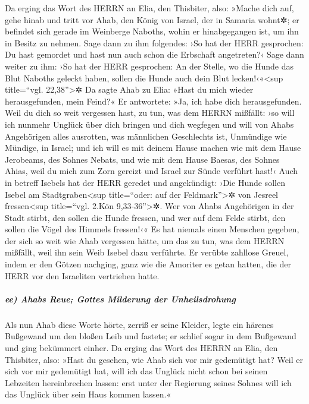 Da erging das Wort des HERRN an Elia, den Thisbiter,
also: »Mache dich auf, gehe hinab und tritt vor Ahab, den
König von Israel, der in Samaria wohnt✲; er befindet sich gerade im
Weinberge Naboths, wohin er hinabgegangen ist, um ihn in Besitz zu
nehmen. Sage dann zu ihm folgendes: ›So hat der HERR
gesprochen: Du hast gemordet und hast nun auch schon die Erbschaft
angetreten?‹ Sage dann weiter zu ihm: ›So hat der HERR gesprochen: An
der Stelle, wo die Hunde das Blut Naboths geleckt haben, sollen die
Hunde auch dein Blut lecken!‹«\textless sup title=``vgl.
22,38''\textgreater✲ Da sagte Ahab zu Elia: »Hast du mich
wieder herausgefunden, mein Feind?« Er antwortete: »Ja, ich habe dich
herausgefunden. Weil du dich so weit vergessen hast, zu tun, was dem
HERRN mißfällt: ›so will ich nunmehr Unglück über dich
bringen und dich wegfegen und will von Ahabs Angehörigen alles
ausrotten, was männlichen Geschlechts ist, Unmündige wie Mündige, in
Israel; und ich will es mit deinem Hause machen wie mit
dem Hause Jerobeams, des Sohnes Nebats, und wie mit dem Hause Baesas,
des Sohnes Ahias, weil du mich zum Zorn gereizt und Israel zur Sünde
verführt hast!‹ Auch in betreff Isebels hat der HERR
geredet und angekündigt: ›Die Hunde sollen Isebel am
Stadtgraben\textless sup title=``oder: auf der Feldmark''\textgreater✲
von Jesreel fressen\textless sup title=``vgl. 2.Kön
9,33-36''\textgreater✲. Wer von Ahabs Angehörigen in der
Stadt stirbt, den sollen die Hunde fressen, und wer auf dem Felde
stirbt, den sollen die Vögel des Himmels fressen!‹« Es
hat niemals einen Menschen gegeben, der sich so weit wie Ahab vergessen
hätte, um das zu tun, was dem HERRN mißfällt, weil ihn sein Weib Isebel
dazu verführte. Er verübte zahllose Greuel, indem er den
Götzen nachging, ganz wie die Amoriter es getan hatten, die der HERR vor
den Israeliten vertrieben hatte.

\hypertarget{ee-ahabs-reue-gottes-milderung-der-unheilsdrohung}{%
\subparagraph{ee) Ahabs Reue; Gottes Milderung der
Unheilsdrohung}\label{ee-ahabs-reue-gottes-milderung-der-unheilsdrohung}}

Als nun Ahab diese Worte hörte, zerriß er seine Kleider,
legte ein härenes Bußgewand um den bloßen Leib und fastete; er schlief
sogar in dem Bußgewand und ging bekümmert einher. Da
erging das Wort des HERRN an Elia, den Thisbiter, also:
»Hast du gesehen, wie Ahab sich vor mir gedemütigt hat?
Weil er sich vor mir gedemütigt hat, will ich das Unglück nicht schon
bei seinen Lebzeiten hereinbrechen lassen: erst unter der Regierung
seines Sohnes will ich das Unglück über sein Haus kommen lassen.«

